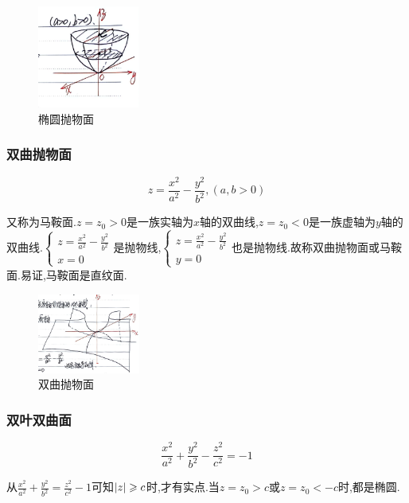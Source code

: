 \begin{figure}[htbp]
    \centering
    \includegraphics[width=0.3\textwidth]{figure/4-5.png}
    \caption{椭圆抛物面}
    \label{fig:椭圆抛物面}
\end{figure}


\subsubsection*{双曲抛物面}

$$
z = \frac{x^2}{a^2} - \frac{y^2}{b^2},(a,b > 0)
$$

又称为马鞍面.$z = z_0 > 0 $是一族实轴为$x$轴的双曲线,$z = z_0 < 0$是一族虚轴为$y$轴的双曲线.$\begin{cases}
    z = \frac{x^2}{a^2} - \frac{y^2}{b^2}\\
    x = 0
\end{cases}$是抛物线,$\begin{cases}
    z = \frac{x^2}{a^2} - \frac{y^2}{b^2}\\
    y = 0
\end{cases}$也是抛物线.故称双曲抛物面或马鞍面.易证,马鞍面是直纹面.

\begin{figure}[htbp]
    \centering
    \includegraphics[width=0.3\textwidth]{figure/4-6.png}
    \caption{双曲抛物面}
    \label{fig:双曲抛物面}
\end{figure}

\subsubsection*{双叶双曲面}

$$
\frac{x^2}{a^2} + \frac{y^2}{b^2} - \frac{z^2}{c^2} = -1
$$

从$\frac{x^2}{a^2} + \frac{y^2}{b^2} = \frac{z^2}{c^2} - 1$可知$|z|\geqslant c$时,才有实点.当$z = z_0 > c$或$z = z_0 < -c$时,都是椭圆.


